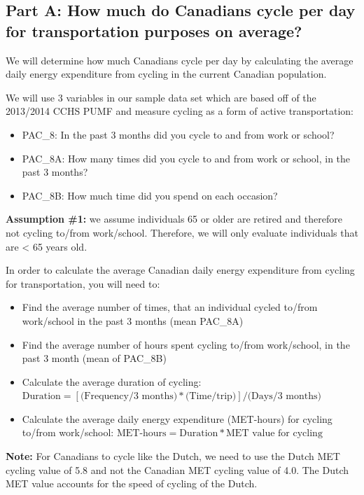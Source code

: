 \documentclass[]{book}
\providecommand{\tightlist}{%
  \setlength{\itemsep}{0pt}\setlength{\parskip}{0pt}}
\begin{document}
\subsection{Part A: How much do Canadians cycle per day for
transportation purposes on
average?}\label{part-a-how-much-do-canadians-cycle-per-day-for-transportation-purposes-on-average}

We will determine how much Canadians cycle per day by calculating the
average daily energy expenditure from cycling in the current Canadian
population.

We will use 3 variables in our sample data set which are based off of
the 2013/2014 CCHS PUMF and measure cycling as a form of active
transportation:

\begin{itemize}
\tightlist
\item
  PAC\_8: In the past 3 months did you cycle to and from work or school?
\item
  PAC\_8A: How many times did you cycle to and from work or school, in
  the past 3 months?
\item
  PAC\_8B: How much time did you spend on each occasion?
\end{itemize}

\textbf{Assumption \#1:} we assume individuals 65 or older are retired
and therefore not cycling to/from work/school. Therefore, we will only
evaluate individuals that are \textless{} 65 years old.

In order to calculate the average Canadian daily energy expenditure from
cycling for transportation, you will need to:

\begin{itemize}
\item
  Find the average number of times, that an individual cycled to/from
  work/school in the past 3 months (mean PAC\_8A)
\item
  Find the average number of hours spent cycling to/from work/school, in
  the past 3 month (mean of PAC\_8B)
\item
  Calculate the average duration of cycling:
  \(\text{Duration} = [\text{(Frequency/3 months)}*\text{(Time/trip)}] / \text{(Days/3 months)}\)
\item
  Calculate the average daily energy expenditure (MET-hours) for cycling
  to/from work/school:
  \(\text{MET-hours} = \text{Duration}*\text{MET value for cycling}\)
\end{itemize}

\textbf{Note:} For Canadians to cycle like the Dutch, we need to use the
Dutch MET cycling value of 5.8 and not the Canadian MET cycling value of
4.0. The Dutch MET value accounts for the speed of cycling of the Dutch.
\end{document}
